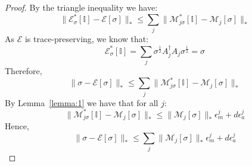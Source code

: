 \documentclass[aps,floatfix,10pt,amssymb,amsfont,amsmath,superscriptaddress,float,nofootinbib,longbibliography,nobalancelastpage,twocolumn]{revtex4-2}
\newtheorem{theorem}{Theorem}
\begin{document}
\begin{proof}
    By the triangle inequality we have:
    \begin{equation}
        \|\mathcal{E}^*_{\sigma}[\mathbb{I}]-\mathcal{E}[\sigma]\|_* \leq \sum_j \|\mathcal{M}^*_{j\sigma}[\mathbb{I}]-\mathcal{M}_{j}[\sigma]\|_*
    \end{equation}
    As $\mathcal{E}$ is trace-preserving, we know that:
    \begin{equation}
        \mathcal{E}^*_{\sigma}[\mathbb{I}] = \sum_{j} \sigma^{\frac{1}{2}}A^{\dagger}_{j} A_{j}\sigma^{\frac{1}{2}} = \sigma
    \end{equation}
    Therefore,
    \begin{equation}
        \|\sigma - \mathcal{E}[\sigma]\|_* \leq \sum_j \|\mathcal{M}^*_{j\sigma}[\mathbb{I}]-\mathcal{M}_{j}[\sigma]\|_*
    \end{equation}
    By Lemma~\ref{lemma:1} we have that for all $j$:
    \begin{equation}
        \|\mathcal{M}^*_{j\sigma}[\mathbb{I}]-\mathcal{M}_{j}[\sigma]\|_* \leq \|\mathcal{M}_j[\sigma]\|_*\epsilon^j_m + d\epsilon^j_a
    \end{equation}
    Hence,
    \begin{equation}
        \|\sigma-\mathcal{E}[\sigma]\|_* \leq \sum_j \|\mathcal{M}_j[\sigma]\|_*\epsilon^j_m + d\epsilon^j_a
    \end{equation}
\end{proof}
\end{document}
